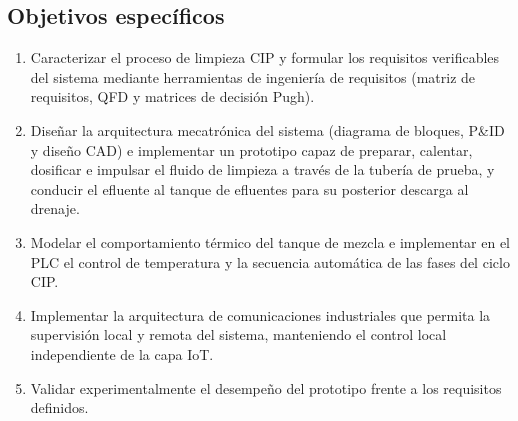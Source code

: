\subsection{Objetivos específicos}
\begin{enumerate}
\item{Caracterizar el proceso de limpieza CIP y formular los requisitos verificables del sistema mediante herramientas de ingeniería de requisitos (matriz de requisitos, QFD y matrices de decisión Pugh).}
\item{Diseñar la arquitectura mecatrónica del sistema (diagrama de bloques, P\&ID y diseño CAD) e implementar un prototipo capaz de preparar, calentar, dosificar e impulsar el fluido de limpieza a través de la tubería de prueba, y conducir el efluente al tanque de efluentes para su posterior descarga al drenaje.}
\item{Modelar el comportamiento térmico del tanque de mezcla e implementar en el PLC el control de temperatura y la secuencia automática de las fases del ciclo CIP.}
\item{Implementar la arquitectura de comunicaciones industriales que permita la supervisión local y remota del sistema, manteniendo el control local independiente de la capa IoT.}
\item{Validar experimentalmente el desempeño del prototipo frente a los requisitos definidos.}
\end{enumerate}

